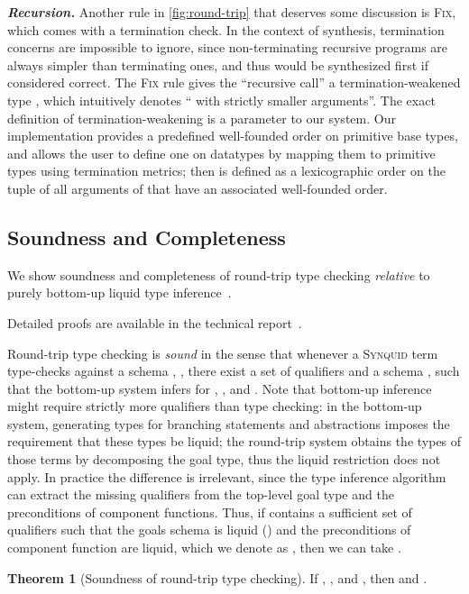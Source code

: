 \documentclass[10pt,preprint]{sigplanconf-pldi16}
\theoremstyle{definition}
\newtheorem{theorem}{Theorem}
\newcommand{\custompar}[1]{\parskip 0pt \textbf{\textit{#1}}}
\newcommand{\lang}{\textsc{Synquid}\xspace}
\newif\iflong
\begin{document}
\custompar{Recursion.}
Another rule in \autoref{fig:round-trip} that deserves some discussion is \textsc{Fix}, which comes with a termination check.
In the context of synthesis, termination concerns are impossible to ignore,
since non-terminating recursive programs are always simpler than terminating ones, 
and thus would be synthesized first if considered correct.  
The \textsc{Fix} rule gives the ``recursive call'' a termination-weakened type ,
which intuitively denotes `` with strictly smaller arguments''.
The exact definition of termination-weakening is a parameter to our system.
Our implementation provides a predefined well-founded order on primitive base types,
and allows the user to define one on datatypes by mapping them to primitive types using termination metrics;
then  is defined as a lexicographic order on the tuple of all arguments of  that have an associated well-founded order. 


\subsection{Soundness and Completeness}\label{sec:theory:proofs}

We show soundness and completeness of round-trip type checking
\emph{relative} to purely bottom-up liquid type inference~\cite{RondonKaJh08}.
\iflong
For detailed proofs see \autoref{app:proofs}.
\else
Detailed proofs are available in the technical report~\cite{Techreport}.
\fi

Round-trip type checking is \emph{sound} in the sense that 
whenever a \lang term  type-checks against a schema , ,
there exist a set of qualifiers  and a schema ,
such that the bottom-up system infers  for , ,
and .
Note that bottom-up inference might require strictly more qualifiers than type checking: 
in the bottom-up system, generating types for branching statements and abstractions
imposes the requirement that these types be liquid;
the round-trip system obtains the types of those terms by decomposing the goal type,
thus the liquid restriction does not apply.
In practice the difference is irrelevant, 
since the type inference algorithm can extract the missing qualifiers 
from the top-level goal type and the preconditions of component functions.
Thus, if  contains a sufficient set of qualifiers
such that the goals schema is liquid () 
and the preconditions of component function are liquid, which we denote as ,
then we can take .

\begin{theorem}[Soundness of round-trip type checking]
If , ,
and , then  and .
\end{theorem}
\end{document}

